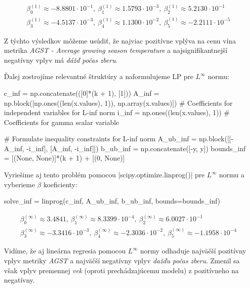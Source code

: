 \documentclass[report.tex]{subfiles}
\begin{document}
\begin{gather*}
	\beta_0^{(1)} \approx -8.8801 \cdot 10^{-1} ,~\beta_1^{(1)} \approx 1.5793\cdot 10^{-3},~\beta_2^{(1)} \approx 5.2130\cdot 10^{-1} \\
	\beta_3^{(1)} \approx -4.5137\cdot 10^{-3} ,~\beta_4^{(1)} \approx 1.1300\cdot 10^{-2}  ,~\beta_5^{(1)} \approx -2.2111\cdot 10^{-5}
\end{gather*}

Z týchto výsledkov môžeme usúdiť, že najviac pozitívne vplýva na cenu vína metrika \textit{AGST - Average growing season temperature} a najsignifikantnejší negatívny vplyv má \textit{dážď počas zberu}.


Ďalej zostrojíme relevantné štruktúry a naformulujeme LP pre $L^{\infty}$ normu:

\begin{python}
c_inf = np.concatenate(([0]*(k + 1), [1]))
A_inf = np.block([np.ones((len(x.values), 1)), np.array(x.values)]) # Coefficients for independent variables for L-inf norm
i_inf = np.ones((len(x.values), 1)) # Coefficients for gamma scalar variable

# Formulate inequality constraints for L-inf norm
A_ub_inf = np.block([[-A_inf, -i_inf], [A_inf, -i_inf]])
b_ub_inf = np.concatenate([-y, y])
bounds_inf = [(None, None)]*(k + 1) + [(0, None)] 
\end{python}

\newpage

Vyriešime aj tento problém pomocou \pyth|scipy.optimize.linprog()| pre $L^{\infty}$ normu a vyberieme $\beta$ koeficienty:

\begin{python}
solve_inf = linprog(c_inf, A_ub_inf, b_ub_inf, bounds=bounds_inf)
\end{python}

\begin{gather*}
	\beta_0^{(\infty)} \approx  3.4841 ,~\beta_1^{(\infty)} \approx 8.3399\cdot 10^{-4} ,~\beta_2^{(\infty)} \approx 6.0027\cdot 10^{-1} \\
	\beta_3^{(\infty)} \approx -3.3416\cdot 10^{-3} ,~\beta_4^{(\infty)} \approx -2.3036\cdot 10^{-2}  ,~\beta_5^{(\infty)} \approx -1.1958\cdot 10^{-4}
\end{gather*}

Vidíme, že aj lineárna regresia pomocou $L^{\infty}$ normy odhaduje najväčší pozitívny vplyv metriky \textit{AGST} a najväčší negatívny vplyv \textit{dažďu počas zberu}. Zmenil sa však vplyv premennej \textit{vek} (oproti prechádzajúcemu modelu) z pozitívneho na negatívny.
\end{document}
